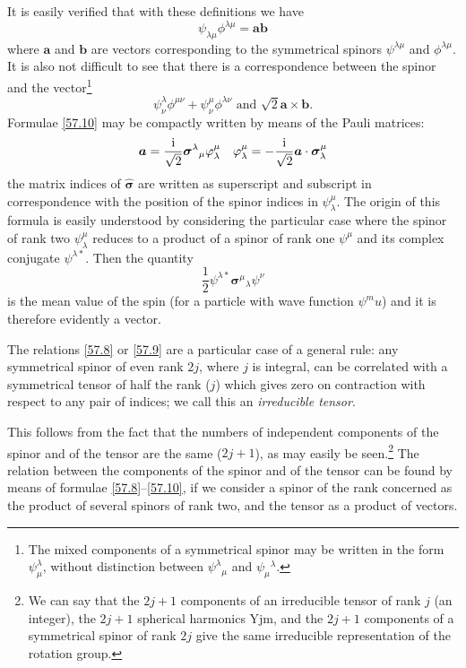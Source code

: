 It is easily verified that with these definitions we have
\begin{equation}\label{57.11}
\psi_{\lambda\mu}\phi^{\lambda\mu}=\bm{a}\bm{b}
\end{equation}
where $ \bm{a} $ and $ \bm{b} $ are vectors corresponding to the symmetrical spinors $\psi^{\lambda\mu}$ and $ \phi^{\lambda\mu} $. It is also not difficult to see that there is a correspondence between the spinor and the vector\footnote{The mixed components of a symmetrical spinor may be written in the form $ \psi^\lambda_{\mu} $, without distinction between $\psi^\lambda{}_{\mu}$ and $\psi_\mu{}^\lambda$.
}
\begin{equation}\label{57.12}
\psi^\lambda_\nu\phi^{\mu\nu}+\psi^\mu_\nu\phi^{\lambda\nu}\text{ and }\sqrt{2}\bm{a}\times\bm{b}.
\end{equation}
Formulae \eqref{57.10} may be compactly written by means of the Pauli matrices:
\begin{equation}\label{57.13}
\bm{a}=\frac{\mathrm{i}}{\sqrt{2}}\bm{\sigma}^\lambda{}_\mu\varphi^\mu_\lambda\quad\varphi^\mu_\lambda=-\frac{\mathrm{i}}{\sqrt{2}}\bm{a}\cdot\bm{\sigma}^\mu_\lambda
\end{equation}
the matrix indices of $ \hat{\bm{\sigma}} $ are written as superscript and subscript in correspondence with the position of the spinor indices in $\psi^\mu_\lambda$. The origin of this formula is easily understood by considering the particular case where the spinor of rank two $\psi^\mu_\lambda$ reduces to a product of a spinor of rank one $\psi^\mu$ and its complex conjugate $ \psi^{\lambda*} $. Then the quantity
\[ \frac{1}{2}\psi^{\lambda*}\bm{\sigma}^\mu{}_\lambda\psi^\nu \] 
is the mean value of the spin (for a particle with wave function $\psi^mu$) and it is therefore evidently a vector.

The relations \eqref{57.8} or \eqref{57.9} are a particular case of a general rule: any symmetrical spinor of even rank $ 2j $, where $ j $ is integral, can be correlated with a symmetrical tensor of half the rank ($ j $) which gives zero on contraction with respect to any pair of indices; we call this an \textit{irreducible tensor}.

This follows from the fact that the numbers of independent components of the spinor and of the tensor are the same ($ 2j + 1 $), as may easily be seen.\footnote{We can say that the $ 2j + 1 $ components of an irreducible tensor of rank $ j $ (an integer), the $ 2j + 1 $ spherical harmonics Yjm, and the $ 2j + 1 $ components of a symmetrical spinor of rank $ 2j $ give the same irreducible representation of the rotation group.} The relation between the components of the spinor and of the tensor can be found by means of formulae \eqref{57.8}–\eqref{57.10}, if we consider a spinor of the rank concerned as the product of several spinors of rank two, and the tensor as a product of vectors.





